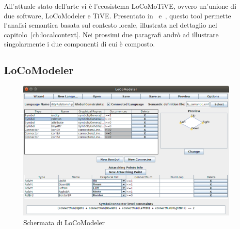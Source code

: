         All'attuale stato dell'arte vi è l'ecosistema LoCoMoTiVE, ovvero un'unione di due software, LoCoModeler e TiVE. Presentato in~\cite{extending_localcontext} e~\cite{localcontext}, questo tool permette l'analisi semantica basata sul contesto locale, illustrata nel dettaglio nel capitolo~\ref{ch:localcontext}. Nei prossimi due paragrafi andrò ad illustrare singolarmente i due componenti di cui è composto.

        \subsection{LoCoModeler}
        
            \begin{figure}[htbp]
                \centering
                \includegraphics[scale=1.5]{Figure/locomodeler.png}
                \caption{Schermata di LoCoModeler \cite{localcontext}}
                \label{fig:locomodeler}
            \end{figure}

